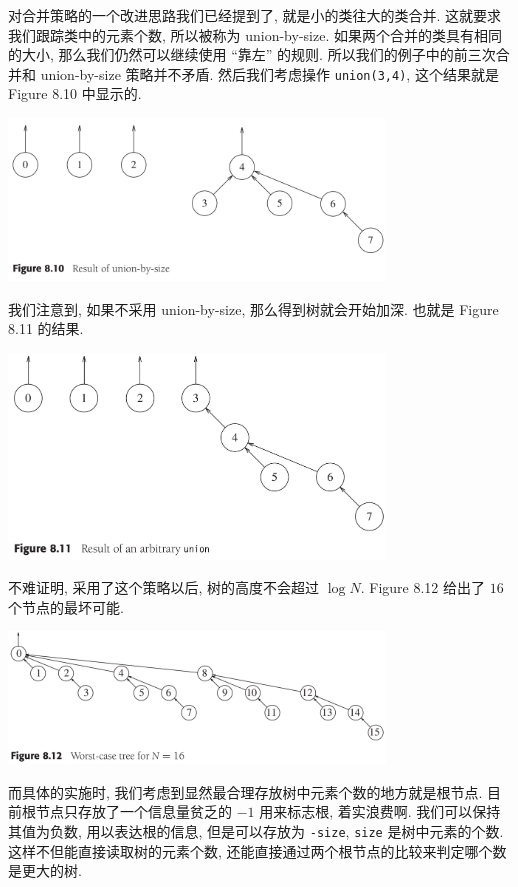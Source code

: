 \documentclass[a4paper]{ctexart}
\theoremstyle{definition}
\theoremstyle{definition}
\begin{document}
对合并策略的一个改进思路我们已经提到了, 就是小的类往大的类合并. 
这就要求我们跟踪类中的元素个数, 所以被称为 union-by-size. 
如果两个合并的类具有相同的大小, 那么我们仍然可以继续使用 ``靠左'' 的规则. 
所以我们的例子中的前三次合并和 union-by-size 策略并不矛盾. 
然后我们考虑操作 \verb|union(3,4)|, 
这个结果就是 Figure 8.10 中显示的. 
\begin{center}
  \includegraphics[width=0.75\textwidth]{images/FIG8_10.png}
\end{center}
我们注意到, 如果不采用 union-by-size, 
那么得到树就会开始加深. 也就是 Figure 8.11 的结果. 
\begin{center}
  \includegraphics[width=0.75\textwidth]{images/FIG8_11.png}
\end{center}
不难证明, 采用了这个策略以后, 树的高度不会超过 $\log N$. 
Figure 8.12 给出了 $16$ 个节点的最坏可能.
\begin{center}
  \includegraphics[width=0.75\textwidth]{images/FIG8_12.png}
\end{center}

而具体的实施时, 我们考虑到显然最合理存放树中元素个数的地方就是根节点. 
目前根节点只存放了一个信息量贫乏的 $-1$ 用来标志根, 着实浪费啊. 我们可以保持其值为负数, 
用以表达根的信息, 但是可以存放为 \verb|-size|, \verb|size| 是树中元素的个数. 
这样不但能直接读取树的元素个数, 还能直接通过两个根节点的比较来判定哪个数是更大的树. 
\end{document}
